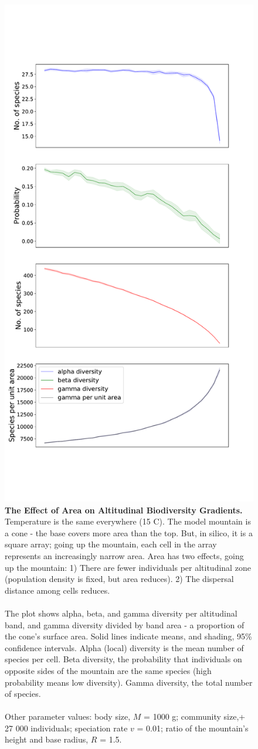\documentclass[11pt]{article}
\begin{document}
\begin{figure}[!hbtp]
\vspace*{-3cm}
\centering
	\includegraphics[width=0.6\linewidth]{../Results/DiversityPlots/AreaNoTemp.pdf}
	\vspace*{-2cm}
	\caption{\textbf{The Effect of Area on Altitudinal Biodiversity Gradients.} Temperature is the same everywhere (15 \degree C). The model mountain is a cone - the base covers more area than the top. But, in silico, it is a square array; going up the mountain, each cell in the array represents an increasingly narrow area. Area has two effects, going up the mountain: 1) There are fewer individuals per altitudinal zone (population density is fixed, but area reduces). 2) The dispersal distance among cells reduces.\\
	\\The plot shows alpha, beta, and gamma diversity per altitudinal band, and gamma diversity divided by band area - a proportion of the cone's surface area. Solid lines indicate means, and shading, 95\% confidence intervals. Alpha (local) diversity is the mean number of species per cell. Beta diversity, the probability that individuals on opposite sides of the mountain are the same species (high probability means low diversity). Gamma diversity, the total number of species.\\
	\\Other parameter values: body size, $M$ = 1000 g; community size,+ 27 000 individuals; speciation rate $v$ = 0.01; ratio of the mountain's height and base radius, $R$ = 1.5.}
\label{AltGradArea}
\end{figure}
\end{document}
